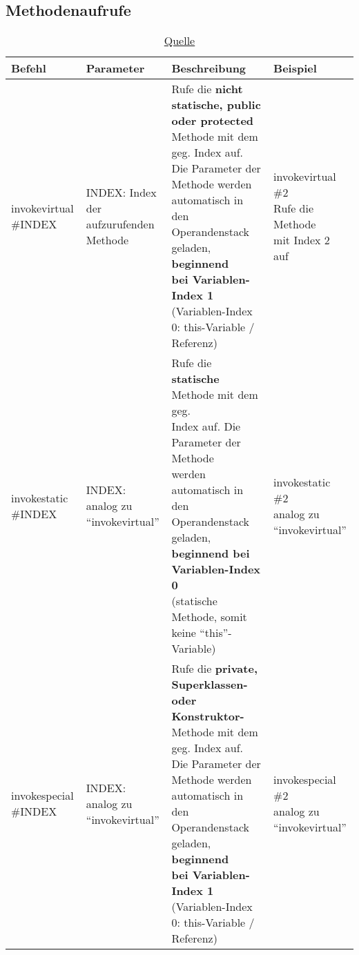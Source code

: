 \subsection{Methodenaufrufe}
\begin{table}[h]
	\centering
	\label{my-label}
	\caption{\href{https://www.javaworld.com/article/2860079/learn-java/invokedynamic-101.html}{Quelle}}
	\begin{tabular}{l|l|l|l|}
		Befehl & Parameter & Beschreibung & Beispiel \\ \hline
		
		invokevirtual \#INDEX 
		& \multlineTable{INDEX: Index der\\ aufzurufenden Methode} 
		& \multlineTable{Rufe die \textbf{nicht statische, public}\\ \textbf{oder protected} Methode mit dem\\ geg. Index auf. Die Parameter der\\ Methode werden automatisch in den\\ Operandenstack geladen, \textbf{beginnend}\\ \textbf{bei Variablen-Index 1}\\ (Variablen-Index 0: this-Variable / Referenz)} 
		& \multlineTable{invokevirtual \#2\\  Rufe die Methode\\ mit Index 2 auf\\ \slide{73}{419} } \\ \hline
		
		invokestatic \#INDEX 
		& \multlineTable{INDEX:  analog zu\\ \enquote{invokevirtual}} 
		& \multlineTable{Rufe die \textbf{statische} Methode mit dem geg.\\ Index auf. Die Parameter der Methode\\ werden automatisch in den Operandenstack\\ geladen, \textbf{beginnend bei Variablen-Index 0}\\ (statische Methode, somit keine \enquote{this}-Variable)} 
		& \multlineTable{invokestatic \#2\\ analog zu \enquote{invokevirtual}}\\  \hline
		
		invokespecial \#INDEX 
		& \multlineTable{INDEX:  analog zu\\ \enquote{invokevirtual}} 
		& \multlineTable{Rufe die \textbf{private, Superklassen- oder Konstruktor-} Methode mit dem geg. Index auf. Die Parameter der\\ Methode werden automatisch in den\\ Operandenstack geladen, \textbf{beginnend}\\ \textbf{bei Variablen-Index 1}\\ (Variablen-Index 0: this-Variable / Referenz)} 
		& \multlineTable{invokespecial \#2 \\ analog zu \enquote{invokevirtual}} \\ \hline
		

\end{tabular}
\end{table}

